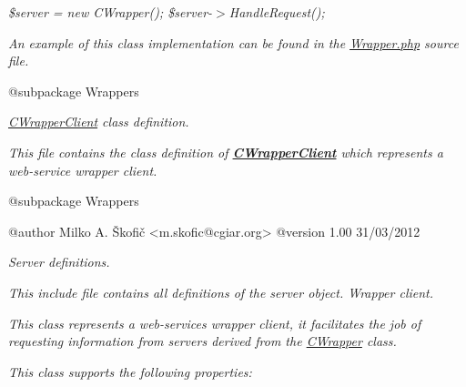 {\itshape {\ttfamily  \$server = new C\-Wrapper(); \$server-\/$>$Handle\-Request(); }}

{\itshape An example of this class implementation can be found in the \hyperlink{}{Wrapper.\-php} source file.}

{\itshape \begin{DoxyVerb} @subpackage        Wrappers\end{DoxyVerb}
}

{\itshape {\itshape \hyperlink{class_c_wrapper_client}{C\-Wrapper\-Client}} class definition.}

{\itshape This file contains the class definition of {\bfseries \hyperlink{class_c_wrapper_client}{C\-Wrapper\-Client}} which represents a web-\/service wrapper client.}

{\itshape \begin{DoxyVerb} @subpackage        Wrappers

 @author            Milko A. Škofič <m.skofic@cgiar.org>
 @version   1.00 31/03/2012\end{DoxyVerb}
}

{\itshape Server definitions.}

{\itshape This include file contains all definitions of the server object. Wrapper client.}

{\itshape This class represents a web-\/services wrapper client, it facilitates the job of requesting information from servers derived from the \hyperlink{class_c_wrapper}{C\-Wrapper} class.}

{\itshape This class supports the following properties\-:}

